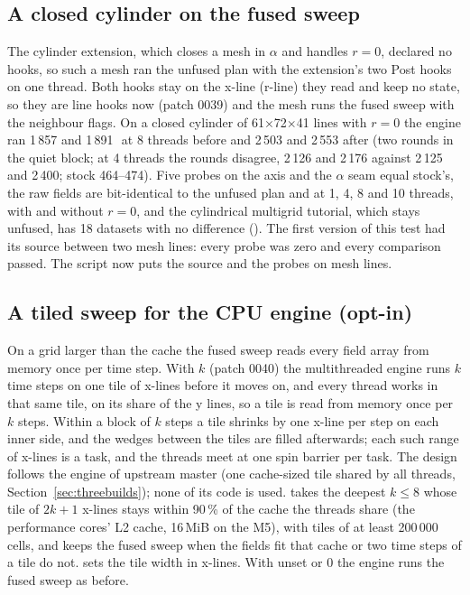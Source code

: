 \subsection{A closed cylinder on the fused sweep}\label{sec:cg31cyl}
The cylinder extension, which closes a mesh in $\alpha$ and handles $r=0$, declared no hooks, so such a mesh ran the
unfused plan with the extension's two Post hooks on one thread. Both hooks stay on the x-line (r-line) they read and
keep no state, so they are line hooks now (patch 0039) and the mesh runs the fused sweep with the neighbour flags. On
a closed cylinder of 61$\times$72$\times$41 lines with $r=0$ the engine ran 1\,857 and 1\,891\,\MC\ at 8 threads before
and 2\,503 and 2\,553 after (two rounds in the quiet block; at 4 threads the rounds disagree, 2\,126 and 2\,176
against 2\,125 and 2\,400; stock 464--474). Five probes on the axis and the $\alpha$ seam equal stock's, the raw
fields are bit-identical to the unfused plan and at 1, 4, 8 and 10 threads, with and without $r=0$, and the
cylindrical multigrid tutorial, which stays unfused, has 18 datasets with no difference
(). The first version of this test had its source between two mesh lines: every
probe was zero and every comparison passed. The script now puts the source and the probes on mesh lines.

\subsection{A tiled sweep for the CPU engine (opt-in)}\label{sec:tiled}
On a grid larger than the cache the fused sweep reads every field array from memory once per time step. With
$k$ (patch 0040) the multithreaded engine runs $k$ time steps on one tile of x-lines before it
moves on, and every thread works in that same tile, on its share of the y lines, so a tile is read from memory once
per $k$ steps. Within a block of $k$ steps a tile shrinks by one x-line per step on each inner side, and the wedges
between the tiles are filled afterwards; each such range of x-lines is a task, and the threads meet at one spin
barrier per task. The design follows the  engine of upstream master (one cache-sized tile shared by all
threads, Section~\ref{sec:threebuilds}); none of its code is used.  takes the deepest
$k\le8$ whose tile of $2k+1$ x-lines stays within 90\,\% of the cache the threads share (the performance cores' L2
cache, 16\,MiB on the M5), with tiles of at least 200\,000 cells, and keeps the fused sweep when the fields fit that
cache or two time steps of a tile do not.  sets the tile width in x-lines. With
 unset or 0 the engine runs the fused sweep as before.

